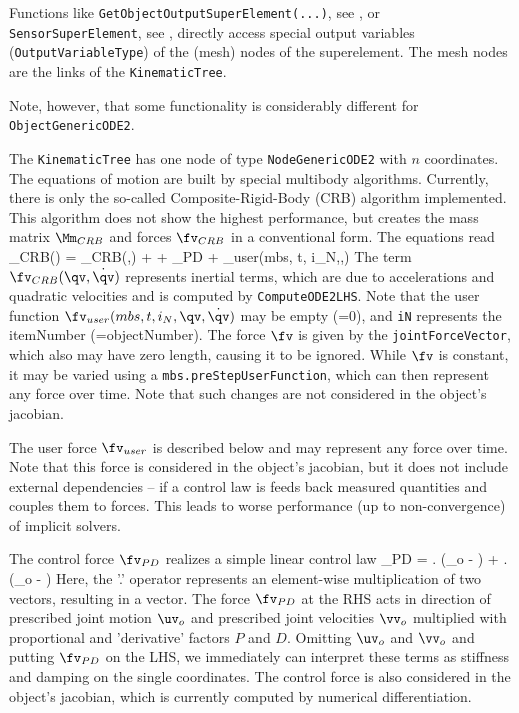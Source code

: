     Functions like \texttt{GetObjectOutputSuperElement(...)}, see , 
    or \texttt{SensorSuperElement}, see , directly access special output variables
    (\texttt{OutputVariableType}) of the (mesh) nodes of the superelement. The mesh nodes are the links of the
    \texttt{KinematicTree}.
    
    Note, however, that some functionality is considerably different for \texttt{ObjectGenericODE2}.
    
    The \texttt{KinematicTree} has one node of type \texttt{NodeGenericODE2} with $n$ coordinates.
    The equations of motion are built by special multibody algorithms. Currently, there is only the
    so-called Composite-Rigid-Body (CRB) algorithm implemented.
    This algorithm does not show the highest performance, but creates the mass matrix $\Mm_{CRB}$ and forces $\fv_{CRB}$
    in a conventional form. The equations read
    \be \label{eq_ObjectGenericODE2_EOM}
      \Mm_{CRB}(\qv) \ddot \qv = \fv_{CRB}(\qv,\dot \qv) + \fv + \fv_{PD} + \fv_{user}(mbs, t, i_N,\qv,\dot \qv)
    \ee
    The term $\fv_{CRB}(\qv,\dot \qv)$ represents inertial terms, which are due to accelerations and 
    quadratic velocities and is computed by \texttt{ComputeODE2LHS}.
    Note that the user function $\fv_{user}(mbs, t, i_N,\qv,\dot \qv)$ may be empty (=0), 
    and \texttt{iN} represents the itemNumber (=objectNumber). 
    The force $\fv$ is given by the \texttt{jointForceVector}, which also may have zero length, causing it to be ignored.
    While $\fv$ is constant, it may be varied using a \texttt{mbs.preStepUserFunction}, which can
    then represent any force over time. Note that such changes are not considered in the object's jacobian.
    
    The user force $\fv_{user}$ is described below and may represent any force over time.
    Note that this force is considered in the object's jacobian, but it does not include external 
    dependencies -- if a control law is feeds back measured quantities and couples them to forces.
    This leads to worse performance (up to non-convergence) of implicit solvers.
    
    The control force $\fv_{PD}$ realizes a simple linear control law
    \be
      \fv_{PD} = \Pm . (\uv_o - \qv) + \Dm . (\vv_o - \dot \qv)
    \ee
    Here, the '.' operator represents an element-wise multiplication of two vectors, resulting in a vector.
    The force $\fv_{PD}$ at the \ac{RHS} acts in direction of prescribed joint motion $\uv_o$ and
    prescribed joint velocities $\vv_o$ multiplied with proportional and 'derivative' factors $P$ and $D$.
    Omitting $\uv_o$ and $\vv_o$ and putting $\fv_{PD}$ on the \ac{LHS}, we immediately can interpret these
    terms as stiffness and damping on the single coordinates.
    The control force is also considered in the object's jacobian, which is currently computed by numerical
    differentiation.
        
